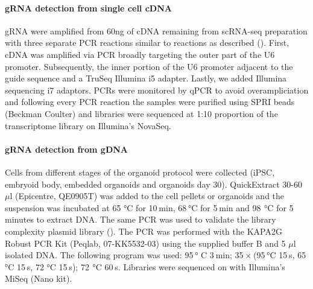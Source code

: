 \paragraph{gRNA detection from single cell cDNA}
gRNA were amplified from 60ng of cDNA remaining from scRNA-seq preparation with three separate PCR reactions similar to reactions as described (\cite{hill_design_2018}). First, cDNA was amplified via PCR broadly targeting the outer part of the U6 promoter. Subsequently, the inner portion of the U6 promoter adjacent to the guide sequence and a TruSeq Illumina i5 adapter. Lastly, we added Illumina sequencing i7 adaptors. PCRs were monitored by qPCR to avoid overampliciation and following every PCR reaction the samples were purified using SPRI beads (Beckman Coulter) and libraries were sequenced at 1:10 proportion of the transcriptome library on Illumina’s NovaSeq.
 
\paragraph{gRNA detection from gDNA}
Cells from different stages of the organoid protocol were collected (iPSC, embryoid body, embedded organoids and organoids day 30). QuickExtract 30-60 $\mu$l (Epicentre, QE0905T) was added to the cell pellets or organoids and the suspension was incubated at 65 °C for 10 min, 68 °C for 5 min and 98  °C for 5 minutes to extract DNA. The same PCR was used to validate the library complexity plasmid library (\cite{datlinger_pooled_2017}). The PCR was performed with the KAPA2G Robust PCR Kit (Peqlab, 07-KK5532-03) using the supplied buffer B and  5 $\mu$l isolated DNA. The following program was used: 95 ° C 3 min; 35 × (95 °C 15 s, 65 °C 15 s, 72  °C 15 s); 72  °C 60 s. Libraries were sequenced on with Illumina’s MiSeq (Nano kit).
 
